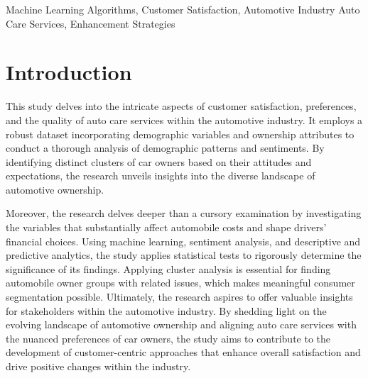 \documentclass[conference]{IEEEtran}
\begin{document}
\begin{IEEEkeywords}
Machine Learning Algorithms, Customer Satisfaction, Automotive Industry Auto Care Services, Enhancement Strategies 
\end{IEEEkeywords}

\section{Introduction}
This study delves into the intricate aspects of customer satisfaction, preferences, and the quality of auto care services within the automotive industry. It employs a robust dataset incorporating demographic variables and ownership attributes to conduct a thorough analysis of demographic patterns and sentiments. By identifying distinct clusters of car owners based on their attitudes and expectations, the research unveils insights into the diverse landscape of automotive ownership. 

Moreover, the research delves deeper than a cursory examination by investigating the variables that substantially affect automobile costs and shape drivers' financial choices. Using machine learning, sentiment analysis, and descriptive and predictive analytics, the study applies statistical tests to rigorously determine the significance of its findings. Applying cluster analysis is essential for finding automobile owner groups with related issues, which makes meaningful consumer segmentation possible.
Ultimately, the research aspires to offer valuable insights for stakeholders within the automotive industry. By shedding light on the evolving landscape of automotive ownership and aligning auto care services with the nuanced preferences of car owners, the study aims to contribute to the development of customer-centric approaches that enhance overall satisfaction and drive positive changes within the industry. 
 
\end{document}
